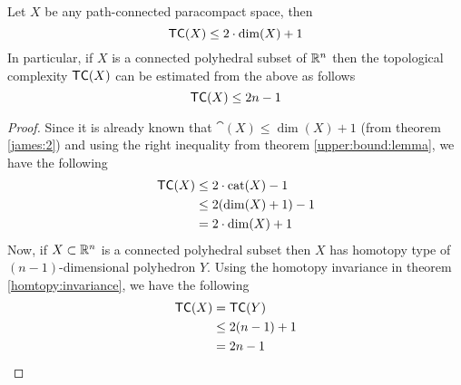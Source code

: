 \begin{thm}
    Let $X$ be any path-connected paracompact space, then
    \[
        \textsf{TC}(X) \le 2 \cdot \dim(X) + 1
    \]
    In particular, if $X$ is a connected polyhedral subset of $\mathbb{R}^n$ then the topological complexity $\textsf{TC}(X)$ can be estimated from the above as follows
    \[
        \textsf{TC}(X) \le 2n - 1
    \]
\end{thm}

\begin{proof}
    Since it is already known that $\cat(X) \le \dim(X) + 1$ (from theorem \ref{james:2}) and using the right inequality from theorem \ref{upper:bound:lemma}, we have the following
    \begin{align*}
        \textsf{TC}(X) & \le 2 \cdot \operatorname{cat}(X) - 1 \\
                  & \le 2 (\dim(X) + 1) - 1 \\
                  & = 2 \cdot \dim(X) + 1
    \end{align*}
    Now, if $X \subset \mathbb{R}^n$ is a connected polyhedral subset then $X$ has homotopy type of $(n-1)$-dimensional polyhedron $Y$. Using the homotopy invariance in theorem \ref{homtopy:invariance}, we have the following
    \begin{align*}
        \textsf{TC}(X) & = \textsf{TC}(Y)    \\
                  & \le 2(n-1) + 1 \\
                  & = 2n - 1
    \end{align*}
\end{proof}



